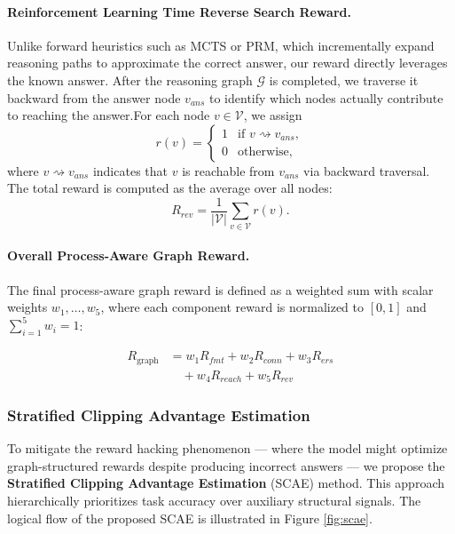 \paragraph{Reinforcement Learning Time Reverse Search Reward.}
Unlike forward heuristics such as MCTS or PRM, which incrementally expand reasoning paths to approximate the correct answer, our reward directly leverages the known answer. 
After the reasoning graph $\mathcal{G}$ is completed, we traverse it backward from the answer node $v_{ans}$ to identify which nodes actually contribute to reaching the answer.For each node $v \in \mathcal{V}$, we assign
\begin{equation}
r(v) =
\begin{cases}
1 & \text{if } v \rightsquigarrow v_{ans}, \\
0 & \text{otherwise,}
\end{cases}
\end{equation}
where $v \rightsquigarrow v_{ans}$ indicates that $v$ is reachable from $v_{ans}$ via backward traversal.
The total reward is computed as the average over all nodes:
\begin{equation}
R_{rev} = \frac{1}{|\mathcal{V}|} \sum_{v \in \mathcal{V}} r(v).
\end{equation}

\paragraph{Overall Process-Aware Graph Reward.}
The final process-aware graph reward is defined as a weighted sum with scalar weights $w_1,\dots,w_5$, where each component reward is normalized to $[0,1]$ and $\sum_{i=1}^{5} w_i = 1$:

\begin{equation}
\begin{aligned}
R_{\text{graph}}
&=
w_1 R_{fmt}
+ w_2 R_{conn}
+ w_3 R_{ers} \\
&\quad
+ w_4 R_{reach}
+ w_5 R_{rev}
\end{aligned}
\end{equation}

\subsubsection{Stratified Clipping Advantage Estimation}

To mitigate the reward hacking phenomenon — where the model might optimize graph-structured rewards despite producing incorrect answers — we propose the \textbf{Stratified Clipping Advantage Estimation} (SCAE) method. This approach hierarchically prioritizes task accuracy over auxiliary structural signals. The logical flow of the proposed SCAE is illustrated in Figure \ref{fig:scae}.

